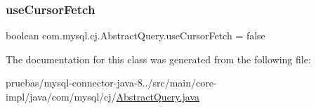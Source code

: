 \subsubsection{\texorpdfstring{use\+Cursor\+Fetch}{useCursorFetch}}
{\footnotesize\ttfamily boolean com.\+mysql.\+cj.\+Abstract\+Query.\+use\+Cursor\+Fetch = false\hspace{0.3cm}{\ttfamily [protected]}}



The documentation for this class was generated from the following file\+:\begin{DoxyCompactItemize}
\item 
pruebas/mysql-\/connector-\/java-\/8../src/main/core-\/impl/java/com/mysql/cj/\mbox{\hyperlink{_abstract_query_8java}{Abstract\+Query.\+java}}\end{DoxyCompactItemize}
